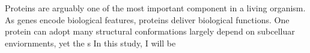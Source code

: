 Proteins are arguably one of the most important component in a living organism. As genes encode biological features, proteins deliver biological functions. One protein can adopt many structural conformations largely depend on subcelluar enviornments, yet the s    In this study, I will be 